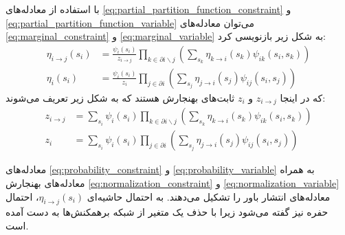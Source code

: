 \begin{appendices}
    با استفاده از معادله‌های
    \ref{eq:partial_partition_function_constraint} و \ref{eq:partial_partition_function_variable}
    می‌توان معادله‌های
    \ref{eq:marginal_constraint} و \ref{eq:marginal_variable}
    به شکل زیر بازنویسی کرد:
    \begin{align}
        \label{eq:probability_constraint}
        \eta_{i \to j}(s_{i}) & = \frac{\psi_{i}(s_{i})}{z_{i \to j}} \prod_{k \in \partial i \backslash j} \left( \sum_{s_{k}} \eta_{k \to i} (s_k) \psi_{ik}(s_{i},s_{k}) \right) \\
        \label{eq:probability_variable}
        \eta_{i}(s_{i})       & = \frac{\psi_{i}(s_{i})}{z_{i}} \prod_{j \in \partial i} \left( \sum_{s_{j}} \eta_{j \to i} (s_{j}) \psi_{ij}(s_{i},s_{j}) \right)
    \end{align}
    که در اینجا
    \( z_{i \to j} \) و \( z_{i} \)
    ثابت‌های بهنجارش هستند که به شکل زیر تعریف می‌شوند:
    \begin{align}
        \label{eq:normalization_constraint}
        z_{i \to j} & = \sum_{s_{i}} \psi_{i}(s_{i}) \prod_{k \in \partial i \backslash j} \left( \sum_{s_{k}} \eta_{k \to i}(s_{k}) \psi_{ik}(s_{i},s_{k}) \right) \\
        \label{eq:normalization_variable}
        z_{i}       & = \sum_{s_{i}} \psi_{i}(s_{i}) \prod_{j \in \partial i} \left( \sum_{s_{j}} \eta_{j \to i}(s_{j}) \psi_{ij}(s_{i},s_{j}) \right)
    \end{align}

    معادله‌های
    \ref{eq:probability_constraint} و \ref{eq:probability_variable}
    به همراه معادله‌های بهنجارش
    \ref{eq:normalization_constraint} و \ref{eq:normalization_variable}
    معادله‌های انتشار باور را تشکیل می‌دهند.
    به احتمال حاشیه‌ای
    \( \eta_{i \to j}(s_{i}) \)،
    احتمال حفره نیز گفته می‌شود زیرا با حذف یک متغیر از شبکه برهمکنش‌ها به دست آمده است.


\end{appendices}
